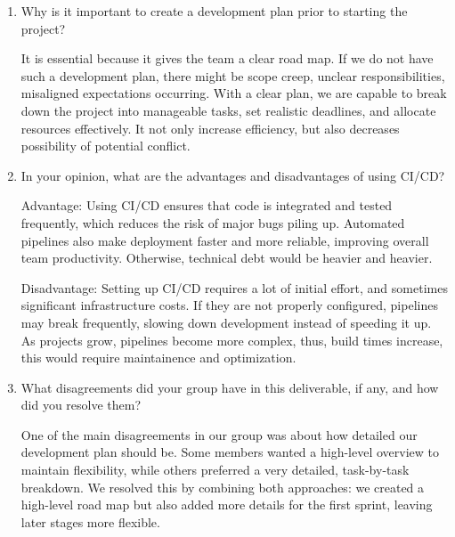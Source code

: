 \documentclass{article}
\begin{document}
\begin{enumerate}
    \item Why is it important to create a development plan prior to starting the
    project?

    It is essential because it gives the team a clear road map. If we do not have such a development plan, there might be scope creep, unclear responsibilities, misaligned expectations occurring. With a clear plan, we are capable to break down the project into manageable tasks, set realistic deadlines, and allocate resources effectively. It not only increase efficiency, but also decreases possibility of potential conflict.
    \item In your opinion, what are the advantages and disadvantages of using
    CI/CD?

    Advantage: Using CI/CD ensures that code is integrated and tested frequently, which reduces the risk of major bugs piling up. Automated pipelines also make deployment faster and more reliable, improving overall team productivity. Otherwise, technical debt would be heavier and heavier.

    Disadvantage: Setting up CI/CD requires a lot of initial effort, and sometimes significant infrastructure costs. If they are not properly configured, pipelines may break frequently, slowing down development instead of speeding it up. As projects grow, pipelines become more complex, thus, build times increase, this would require maintainence and optimization.
    \item What disagreements did your group have in this deliverable, if any,
    and how did you resolve them?

    One of the main disagreements in our group was about how detailed our development plan should be. Some members wanted a high-level overview to maintain flexibility, while others preferred a very detailed, task-by-task breakdown. We resolved this by combining both approaches: we created a high-level road map but also added more details for the first sprint, leaving later stages more flexible.

\end{enumerate}
\end{document}
